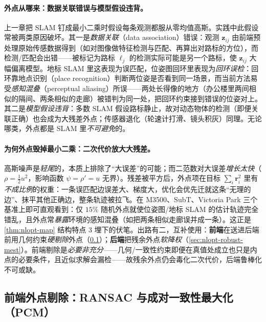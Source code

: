 \paragraph{外点从哪来：数据关联错误与模型假设违背。}\cite{carlone2026handbook}
上一章把 SLAM 钉成最小二乘时假设每条观测都服从零均值高斯。实践中此假设常被两类原因破坏。其一是\emph{数据关联}（data association）错误：观测 $\mathbf{z}_{ij}$ 由前端预处理原始传感数据得到（如对图像做特征检测与匹配、再算出对路标的方位），而检测/匹配会出错——被标记为路标 $\ell_j$ 的检测实际可能是另一个路标，使 $\mathbf{z}_{ij}$ 大幅偏离模型。地标 SLAM 里这表现为误匹配，位姿图回环里表现为\emph{回环误检}：回环靠地点识别（place recognition）判断两位姿是否看到同一场景，而当前方法易受\emph{感知混叠}（perceptual aliasing）所误——两处长得像的地方（办公楼里两间相似的隔间、两条相似的走廊）被错判为同一处，把回环约束接到错误的位姿对上。其二是\emph{模型假设违背}：多数 SLAM 假设路标静止，故对动态物体的检测（即便关联正确）也会成为大残差外点；传感器退化（轮速计打滑、镜头积灰）同理。无论哪类，外点都是 SLAM 里\emph{不可避免}的。

\paragraph{为何外点毁掉最小二乘：二次代价放大大残差。}\cite{gaoxiang2019slam14,barfoot2024state,carlone2026handbook}
高斯噪声是\emph{轻尾}的，本质上排除了“大误差”的可能；而二范数对大误差\emph{增长太快}（$\rho=\tfrac12u^2$，影响函数 $\psi=\rho'=u$ 无界）。残差被平方后，外点项在目标 $\sum_i\mathbf{r}_i^2$ 里有\emph{不成比例}的权重：一条误匹配边误差大、梯度大，优化会优先迁就这条“无理的边”、抹平其他正确边，整条轨迹被拉飞。在 M3500、SubT、Victoria Park 三个基准上即可直观看到：仅 $15\%$ 随机外点就使位姿图/地标 SLAM 的估计轨迹完全错乱，且外点常\emph{暴露}环境的感知混叠（如把两条相似走廊误并成一条）\cite{carlone2026handbook}。这正是 \cref{thm:nlopt-map} 结构特点 3 埋下的伏笔。出路有二，互补使用：\textbf{前端}在送进后端前用几何约束\emph{硬剔除}外点（\cref{sec:nlopt-robust-frontend}）；\textbf{后端}把残余外点\emph{软降权}（\cref{sec:nlopt-robust-mest}）。前端剔除是\emph{必要非充分}——几何/一致性约束即便在真值处成立也只是内点的必要条件，且近似求解会漏检——故残余外点仍会毒化二次代价，后端鲁棒化不可或缺。

\subsection{前端外点剔除：RANSAC 与成对一致性最大化（PCM）}
\label{sec:nlopt-robust-frontend}

